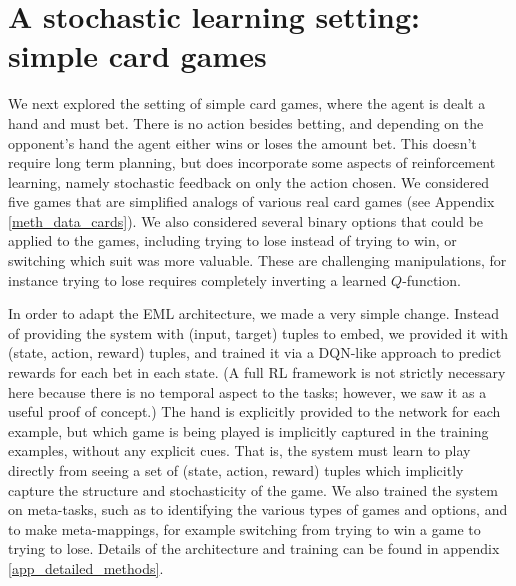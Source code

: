 \documentclass{article}
\begin{document}
\section{A stochastic learning setting: simple card games}\label{sec_cards}
\vspace{-0.5em} %
We next explored the setting of simple card games, where the agent is dealt a hand and must bet. There is no action besides betting, and depending on the opponent's hand the agent either wins or loses the amount bet. This doesn't require long term planning, but does incorporate some aspects of reinforcement learning, namely stochastic feedback on only the action chosen. We considered five games that are simplified analogs of various real card games (see Appendix \ref{meth_data_cards}). We also considered several binary options that could be applied to the games, including trying to lose instead of trying to win, or switching which suit was more valuable. These are challenging manipulations, for instance trying to lose requires completely inverting a learned $Q$-function. \par
In order to adapt the EML architecture, we made a very simple change. Instead of providing the system with (input, target) tuples to embed, we provided it with (state, action, reward) tuples, and trained it via a DQN-like approach \citep{Mnih2015} to predict rewards for each bet in each state. (A full RL framework is not strictly necessary here because there is no temporal aspect to the tasks; however, we saw it as a useful proof of concept.) The hand is explicitly provided to the network for each example, but which game is being played is implicitly captured in the training examples, without any explicit cues. That is, the system must learn to play directly from seeing a set of (state, action, reward) tuples which implicitly capture the structure and stochasticity of the game. We also trained the system on meta-tasks, such as to identifying the various types of games and options, and to make meta-mappings, for example switching from trying to win a game to trying to lose. Details of the architecture and training can be found in appendix \ref{app_detailed_methods}. \par
\vspace{-0.7em}
\end{document}
